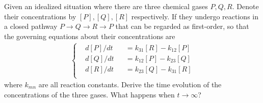 \begin{Exercise}
Given an idealized situation where there are three chemical gases $P, Q, R$. Denote their concentrations by $[P], [Q], [R]$ respectively. If they undergo reactions in a closed pathway $P \to Q \to R \to P$ that can be regarded as first-order, so that the governing equations about their concentrations are
\begin{align*}
\left\{\begin{alignedat}{2}
&d[P]/dt& &= k_{31}[R] - k_{12}[P] \\
&d[Q]/dt& &= k_{12}[P] - k_{23}[Q] \\
&d[R]/dt& &= k_{23}[Q] - k_{31}[R] \\
\end{alignedat}\right.
\end{align*}
where $k_{mn}$ are all reaction constants. Derive the time evolution of the concentrations of the three gases. What happens when $t \to \infty$?
\end{Exercise}